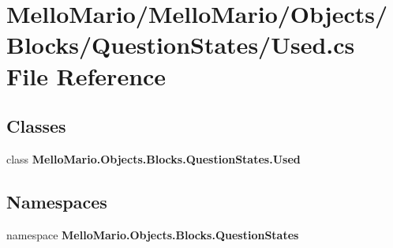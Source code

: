 \section{Mello\+Mario/\+Mello\+Mario/\+Objects/\+Blocks/\+Question\+States/\+Used.cs File Reference}
\label{QuestionStates_2Used_8cs}
\subsection*{Classes}
\begin{DoxyCompactItemize}
\item 
class \textbf{ Mello\+Mario.\+Objects.\+Blocks.\+Question\+States.\+Used}
\end{DoxyCompactItemize}
\subsection*{Namespaces}
\begin{DoxyCompactItemize}
\item 
namespace \textbf{ Mello\+Mario.\+Objects.\+Blocks.\+Question\+States}
\end{DoxyCompactItemize}
